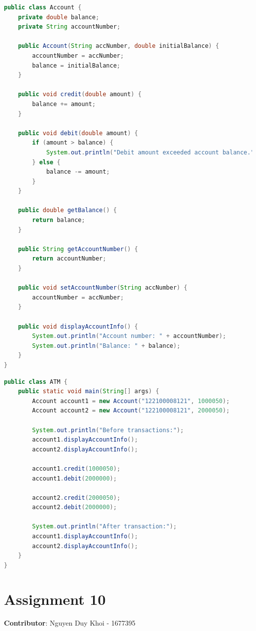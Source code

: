 \documentclass{article}
\begin{document}
\begin{lstlisting}[language=Java, caption=Account.java]
public class Account {
    private double balance;
    private String accountNumber;

    public Account(String accNumber, double initialBalance) {
        accountNumber = accNumber;
        balance = initialBalance;
    }

    public void credit(double amount) {
        balance += amount;
    }

    public void debit(double amount) {
        if (amount > balance) {
            System.out.println("Debit amount exceeded account balance.");
        } else {
            balance -= amount;
        }
    }

    public double getBalance() {
        return balance;
    }

    public String getAccountNumber() {
        return accountNumber;
    }

    public void setAccountNumber(String accNumber) {
        accountNumber = accNumber;
    }

    public void displayAccountInfo() {
        System.out.println("Account number: " + accountNumber);
        System.out.println("Balance: " + balance);
    }
}
\end{lstlisting}

\begin{lstlisting}[language=Java, caption=ATM.java]
public class ATM {
    public static void main(String[] args) {
        Account account1 = new Account("122100008121", 1000050);
        Account account2 = new Account("122100008121", 2000050);

        System.out.println("Before transactions:");
        account1.displayAccountInfo();
        account2.displayAccountInfo();

        account1.credit(1000050);
        account1.debit(2000000);

        account2.credit(2000050);
        account2.debit(2000000);

        System.out.println("After transaction:");
        account1.displayAccountInfo();
        account2.displayAccountInfo();
    }
}
\end{lstlisting}

\section*{Assignment 10}

\textbf{Contributor}: Nguyen Duy Khoi - 1677395
\end{document}
